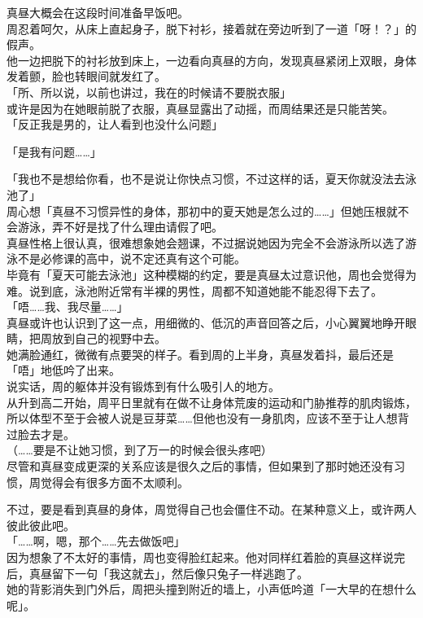 真昼大概会在这段时间准备早饭吧。\\

周忍着呵欠，从床上直起身子，脱下衬衫，接着就在旁边听到了一道「呀！？」的假声。\\

他一边把脱下的衬衫放到床上，一边看向真昼的方向，发现真昼紧闭上双眼，身体发着颤，脸也转眼间就发红了。\\

「所、所以说，以前也讲过，我在的时候请不要脱衣服」\\

或许是因为在她眼前脱了衣服，真昼显露出了动摇，而周结果还是只能苦笑。\\

「反正我是男的，让人看到也没什么问题」

「是我有问题……」

「我也不是想给你看，也不是说让你快点习惯，不过这样的话，夏天你就没法去泳池了」\\

周心想「真昼不习惯异性的身体，那初中的夏天她是怎么过的……」但她压根就不会游泳，弄不好是找了什么理由请假了吧。\\

真昼性格上很认真，很难想象她会翘课，不过据说她因为完全不会游泳所以选了游泳不是必修课的高中，说不定还真有这个可能。\\

毕竟有「夏天可能去泳池」这种模糊的约定，要是真昼太过意识他，周也会觉得为难。说到底，泳池附近常有半裸的男性，周都不知道她能不能忍得下去了。\\

「唔……我、我尽量……」\\

真昼或许也认识到了这一点，用细微的、低沉的声音回答之后，小心翼翼地睁开眼睛，把周放到自己的视野中去。\\

她满脸通红，微微有点要哭的样子。看到周的上半身，真昼发着抖，最后还是「唔」地低吟了出来。\\

说实话，周的躯体并没有锻炼到有什么吸引人的地方。\\

从升到高二开始，周平日里就有在做不让身体荒废的运动和门胁推荐的肌肉锻炼，所以体型不至于会被人说是豆芽菜……但他也没有一身肌肉，应该不至于让人想背过脸去才是。\\

（……要是不让她习惯，到了万一的时候会很头疼吧）\\

尽管和真昼变成更深的关系应该是很久之后的事情，但如果到了那时她还没有习惯，周觉得会有很多方面不太顺利。

不过，要是看到真昼的身体，周觉得自己也会僵住不动。在某种意义上，或许两人彼此彼此吧。\\

「……啊，嗯，那个……先去做饭吧」\\

因为想象了不太好的事情，周也变得脸红起来。他对同样红着脸的真昼这样说完后，真昼留下一句「我这就去」，然后像只兔子一样逃跑了。\\

她的背影消失到门外后，周把头撞到附近的墙上，小声低吟道「一大早的在想什么呢」。
